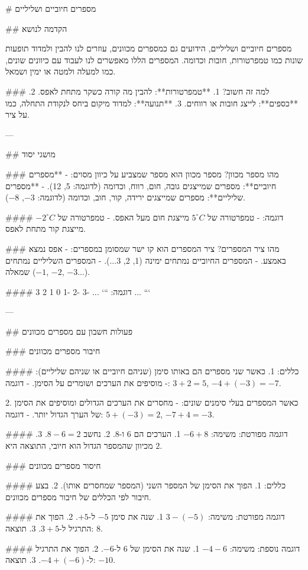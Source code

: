 # מספרים חיוביים ושליליים

## הקדמה לנושא

מספרים חיוביים ושליליים, הידועים גם כמספרים מכוונים, עוזרים לנו להבין ולמדוד תופעות שונות כמו טמפרטורות, חובות וכדומה. המספרים הללו מאפשרים לנו לעבוד עם כיוונים שונים, כמו למעלה ולמטה או ימין ושמאל.

### למה זה חשוב?
1. **טמפרטורות**: להבין מה קורה כשקר מתחת לאפס.
2. **כספים**: לייצג חובות או רווחים.
3. **תנועה**: למדוד מיקום ביחס לנקודת התחלה, כמו על ציר.

---

## מושגי יסוד

### מהו מספר מכוון?
מספר מכוון הוא מספר שמצביע על כיוון מסוים:
- **מספרים חיוביים**: מספרים שמייצגים גובה, חום, רווח, וכדומה (לדוגמה: 5, 12).
- **מספרים שליליים**: מספרים שמייצגים ירידה, קור, חוב, וכדומה (לדוגמה: $-3$, $-8$).

#### דוגמה:
- טמפרטורה של $5^{\circ}C$ מייצגת חום מעל האפס.
- טמפרטורה של $-2^{\circ}C$ מייצגת קור מתחת לאפס.

### מהו ציר המספרים?
ציר המספרים הוא קו ישר שמסומן במספרים:
- אפס נמצא באמצע.
- המספרים החיוביים נמתחים ימינה (1, 2, 3...).
- המספרים השליליים נמתחים שמאלה ($-1$, $-2$, $-3$...).

#### דוגמה:
```
... -3   -2   -1   0   1   2   3 ...
```

---

## פעולות חשבון עם מספרים מכוונים

### חיבור מספרים מכוונים

#### כללים:
1. כאשר שני מספרים הם באותו סימן (שניהם חיוביים או שניהם שליליים):
   - מוסיפים את הערכים ושומרים על הסימן.
   - דוגמה: $3 + 2 = 5$, $-4 + (-3) = -7$.

2. כאשר המספרים בעלי סימנים שונים:
   - מחסרים את הערכים הגדולים ומוסיפים את הסימן של הערך הגדול יותר.
   - דוגמה: $5 + (-3) = 2$, $-7 + 4 = -3$.

#### דוגמה מפורטת:
משימה: $-6 + 8$
1. הערכים הם $6$ ו-$8$.
2. נחשב $8 - 6 = 2$.
3. מכיוון שהמספר הגדול הוא חיובי, התוצאה היא $2$.


### חיסור מספרים מכוונים

#### כללים:
1. הפוך את הסימן של המספר השני (המספר שמחסרים אותו).
2. בצע חיבור לפי הכללים של חיבור מספרים מכוונים.

#### דוגמה מפורטת:
משימה: $3 - (-5)$
1. שנה את סימן $-5$ ל-$+5$.
2. הפוך את התרגיל ל-$3 + 5$.
3. תוצאה: $8$.

#### דוגמה נוספת:
משימה: $-4 - 6$
1. שנה את הסימן של $6$ ל-$-6$.
2. הפוך את התרגיל ל-$-4 + (-6)$.
3. תוצאה: $-10$.

